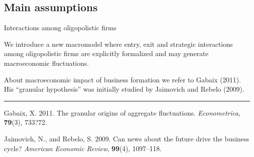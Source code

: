 \documentclass[9pt]{beamer}
\begin{document}
\subsection{Main assumptions}

\begin{frame}{Interactions among oligopolistic firms}

We introduce a new macromodel where entry, exit and strategic interactions among oligopolistic firms are explicitly formalized and may generate macroeconomic fluctuations. 

About macroeconomic impact of business formation we refer to Gabaix (2011). His ``granular hypothesis'' was initially studied by Jaimovich and Rebelo (2009). 

\bigskip
\bigskip
\bigskip
\bigskip
\bigskip


\noindent\rule{8cm}{0.4pt}
\scriptsize


Gabaix, X. 2011. The granular origins of aggregate fluctuations. \emph{Econometrica}, \textbf{79}(3), 733?72.

Jaimovich, N., and Rebelo, S. 2009. Can news about the future drive the
business cycle? \emph{American Economic Review}, \textbf{99}(4), 1097--118.

\end{frame}
\end{document}
